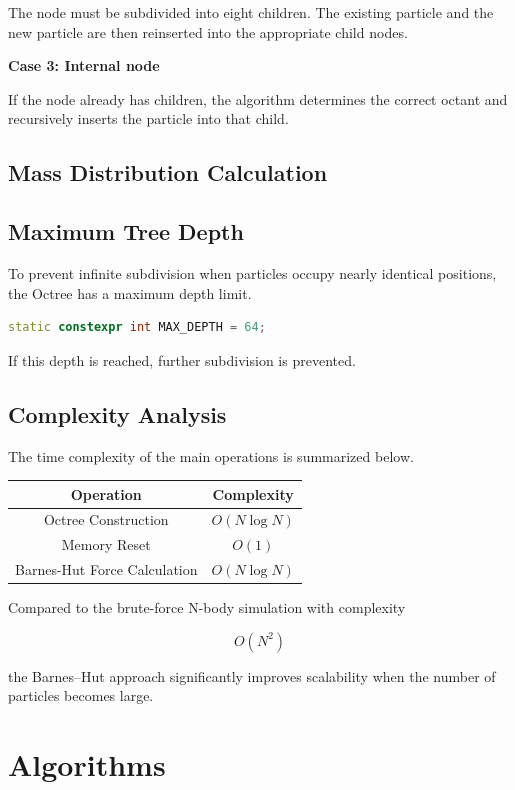 The node must be subdivided into eight children. The existing particle and the new particle are then reinserted into the appropriate child nodes.

\textbf{Case 3: Internal node}

If the node already has children, the algorithm determines the correct octant and recursively inserts the particle into that child.

\subsection{Mass Distribution Calculation}


\subsection{Maximum Tree Depth}

To prevent infinite subdivision when particles occupy nearly identical positions, the Octree has a maximum depth limit.

\begin{lstlisting}[language=C++]
static constexpr int MAX_DEPTH = 64;
\end{lstlisting}

If this depth is reached, further subdivision is prevented.

\subsection{Complexity Analysis}

The time complexity of the main operations is summarized below.

\begin{center}
\begin{tabular}{c c}
Operation & Complexity \\
\hline
Octree Construction & $O(N\log N)$ \\
Memory Reset & $O(1)$ \\
Barnes-Hut Force Calculation & $O(N\log N)$
\end{tabular}
\end{center}

Compared to the brute-force N-body simulation with complexity

\[
O(N^2)
\]

the Barnes–Hut approach significantly improves scalability when the number of particles becomes large.


\section{Algorithms}

